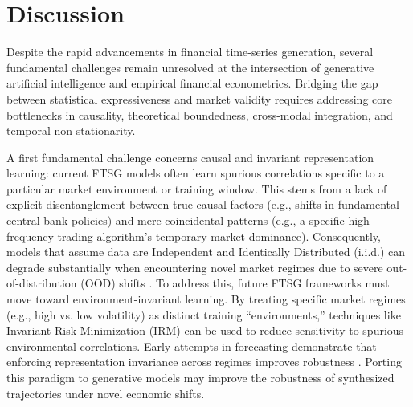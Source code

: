 \section{Discussion}
\label{sec:discussion}

Despite the rapid advancements in financial time-series generation, several fundamental challenges remain unresolved at the intersection of generative artificial intelligence and empirical financial econometrics. Bridging the gap between statistical expressiveness and market validity requires addressing core bottlenecks in causality, theoretical boundedness, cross-modal integration, and temporal non-stationarity.

A first fundamental challenge concerns causal and invariant representation learning: current FTSG models often learn spurious correlations specific to a particular market environment or training window. This stems from a lack of explicit disentanglement between true causal factors (e.g., shifts in fundamental central bank policies) and mere coincidental patterns (e.g., a specific high-frequency trading algorithm's temporary market dominance). Consequently, models that assume data are Independent and Identically Distributed (i.i.d.) can degrade substantially when encountering novel market regimes due to severe out-of-distribution (OOD) shifts \citep{arjovsky2019invariant, peters2016causal}. 
To address this, future FTSG frameworks must move toward environment-invariant learning. By treating specific market regimes (e.g., high vs. low volatility) as distinct training ``environments,'' techniques like Invariant Risk Minimization (IRM) \citep{arjovsky2019invariant} can be used to reduce sensitivity to spurious environmental correlations. Early attempts in forecasting demonstrate that enforcing representation invariance across regimes improves robustness \citep{cao2023irm}. Porting this paradigm to generative models may improve the robustness of synthesized trajectories under novel economic shifts.

